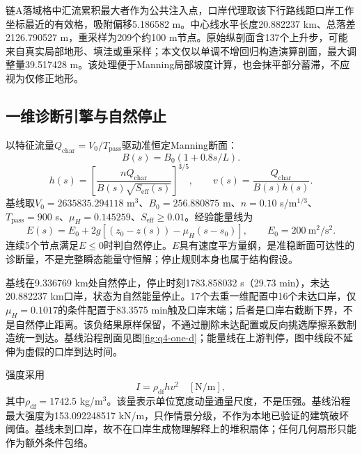 链A落域格中汇流累积最大者作为公共注入点，口岸代理取该下行路线距口岸工作坐标最近的有效格，吸附偏移5.186582 m。中心线水平长度20.882237 km、总落差2126.790527 m，重采样为209个约100 m节点。原始纵剖面含137个上升步，可能来自真实局部地形、填洼或重采样；本文仅以单调不增回归构造演算剖面，最大调整量39.517428 m。该处理便于Manning局部坡度计算，也会抹平部分蓄滞，不应视为仅修正地形。

\subsection{一维诊断引擎与自然停止}
以特征流量$Q_{\mathrm{char}}=V_0/T_{\mathrm{pass}}$驱动准恒定Manning断面\cite{chow1959}：
\begin{equation}
B(s)=B_0(1+0.8s/L).
\end{equation}
\begin{equation}
h(s)=\left[\frac{nQ_{\mathrm{char}}}{B(s)\sqrt{S_{\mathrm{eff}}(s)}}\right]^{3/5},
\qquad
v(s)=\frac{Q_{\mathrm{char}}}{B(s)h(s)}.
\end{equation}
基线取$V_0=2635835.294118$ m$^3$、$B_0=256.880875$ m、$n=0.10$ s/m$^{1/3}$、$T_{\mathrm{pass}}=900$ s、$\mu_H=0.145259$、$S_{\mathrm{eff}}\ge0.01$。经验能量线为
\begin{equation}
E(s)=E_0+2g\left[(z_0-z(s))-\mu_H(s-s_0)\right],
\qquad E_0=200\ \mathrm{m^2/s^2}.
\end{equation}
连续5个节点满足$E\le0$时判自然停止。$E$具有速度平方量纲，是准稳断面可达性的诊断量，不是完整瞬态能量守恒解；停止规则本身也属于结构假设。

基线在9.336769 km处自然停止，停止时刻1783.858032 s（29.73 min），未达20.882237 km口岸，状态为自然能量停止。17个去重一维配置中16个未达口岸，仅$\mu_H=0.1017$的条件配置于83.3575 min触及口岸末端；后者是口岸右截断下界，不是自然停止距离。该负结果原样保留，不通过删除未达配置或反向挑选摩擦系数制造统一到达。基线沿程剖面见图\ref{fig:q4-one-d}；能量线在上游判停，图中线段不延伸为虚假的口岸到达时间。


强度采用
\begin{equation}
I=\rho_{\mathrm{df}}hv^2\quad[\mathrm{N/m}],
\end{equation}
其中$\rho_{\mathrm{df}}=1742.5$ kg/m$^3$。该量表示单位宽度动量通量尺度，不是压强。基线沿程最大强度为153.092248517 kN/m，只作情景分级，不作为本地已验证的建筑破坏阈值。基线未到口岸，故不在口岸生成物理解释上的堆积扇体；任何几何扇形只能作为额外条件包络。

